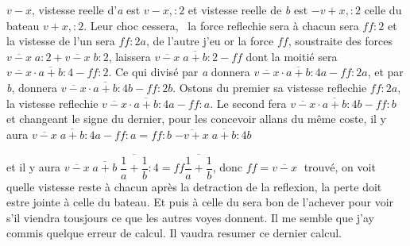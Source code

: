 %
$v-x$, vistesse reelle d'\textit{a} est $v-x,:2$ et vistesse reelle de \textit{b} est $-v+x,:2$ 
%
celle du bateau\protect{} $v+x,:2$. 
%
Leur choc\protect{} cessera\lbrack,\rbrack\
%
%
la force reflechie\protect{} sera
%
%
à chacun sera $ff:2$ et la vistesse
%
%
de l'un sera $ff:2a$, de l'autre
%
%
j'eu
%
or la force\protect{} $ff$, soustraite des forces $\overline{v-x}\;a:2+\overline{v-x}\;b:2$, 
%
laissera $\overline{v-x}\;\overline{a+b}:2-ff$ dont la moitié sera $\overline{v-x}\cdot\overline{a+b}:4-ff:2$. 
%
Ce qui divisé par \textit{a} donnera $\overline{v-x}\cdot\overline{a+b}:4a-ff:2a$, et par \textit{b}, 
%
donnera $\overline{v-x}\cdot\overline{a+b}:4b-ff:2b$. Ostons du premier sa vistesse reflechie\protect{} $ff:2a$,
%
%
la vistesse reflechie\protect{}
%
%
$\overline{v-x}\cdot\overline{a+b}:4a-ff:a$. Le second fera $\overline{v-x}\cdot\overline{a+b}:4b-ff:b$ 
%
et changeant le signe du dernier, pour les concevoir allans du même coste, 
%
il y aura $\overline{v-x}\;\overline{a+b}:4a-ff:a= ff:b\;\overline{-v+x}\;\overline{a+b}:4b$ 
%
\protect\rule[-4mm]{0mm}{10mm}et il y aura $\overline{v-x}\;\overline{a+b}\;\overline{\dfrac{1}{a}+\dfrac{1}{b}}:4=ff\overline{\dfrac{1}{a}+\dfrac{1}{b}}$, 
%
donc $ff=\overline{v-x}\;$%
%
%
trouvé, on voit quelle vistesse reste à chacun après la detraction de la reflexion,\protect{} 
%
la perte doit estre jointe à celle du bateau.\protect{} Et puis à celle du
%
%
sera bon de l'achever pour voir s'il viendra tousjours ce que les autres voyes donnent. 
%
Il me semble que j'ay commis quelque erreur de calcul. Il vaudra resumer ce dernier calcul. \pend
\count\Bfootins=1200%
\count{}%
\count{} 